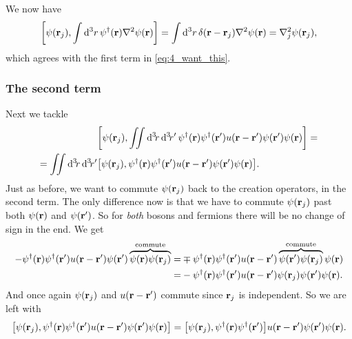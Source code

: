 \documentclass[11pt,letter, swedish, english
]{article}
\begin{document}
We now have
\begin{equation}\label{eq:4_comm_i}
\comm{\psi(\vb{r}_j)}{\int\rd^3r\,
\psi^\dagger(\vb{r})\laplacian\psi(\vb{r})}=
\int\rd^3r\,\delta(\vb{r}-\vb{r}_j)\laplacian\psi(\vb{r})
=\laplacian_j\psi(\vb{r}_j),
\end{equation}
which agrees with the first term in \eqref{eq:4_want_this}.

\subsubsection{The second term}
Next we tackle
\begin{equation}
\begin{aligned}
&\comm{\psi(\vb{r}_j)}{\iint\rd^3\!r\,\rd^3\!r'\,
\psi^\dagger(\vb{r})\psi^\dagger(\vb{r}')
u(\vb{r}-\vb{r}')\psi(\vb{r}')\psi(\vb{r})}=\\
=\iint\rd^3\!r\,\rd^3\!r'&
\comm{\psi(\vb{r}_j)}{
\psi^\dagger(\vb{r})\psi^\dagger(\vb{r}')
u(\vb{r}-\vb{r}')\psi(\vb{r}')\psi(\vb{r})}.
\end{aligned}
\end{equation}
Just as before, we want to commute $\psi(\vb{r}_j)$ back to the
creation operators, in the second term. The only difference now is
that we have to commute $\psi(\vb{r}_j)$ past both $\psi(\vb{r})$ and
$\psi(\vb{r}')$. So for \emph{both} bosons and fermions there will be no
change of sign in the end. We get
\begin{equation}
\begin{aligned}
-\psi^\dagger(\vb{r})\psi^\dagger(\vb{r}')
u(\vb{r}-\vb{r}')\psi(\vb{r}')
\overbrace{\psi(\vb{r})\psi(\vb{r}_j)}^{\text{commute}}
=&\mp\psi^\dagger(\vb{r})\psi^\dagger(\vb{r}')
u(\vb{r}-\vb{r}')
\overbrace{\psi(\vb{r}')\psi(\vb{r}_j)}^{\text{commute}}
\psi(\vb{r})\\
=&-\psi^\dagger(\vb{r})\psi^\dagger(\vb{r}')
u(\vb{r}-\vb{r}')\psi(\vb{r}_j)\psi(\vb{r}')\psi(\vb{r}).
\end{aligned}
\end{equation}
And once again $\psi(\vb{r}_j)$ and $u(\vb{r}-\vb{r}')$ commute since
$\vb{r}_j$ is independent. So we are left with
\begin{equation}
\comm{\psi(\vb{r}_j)}{
\psi^\dagger(\vb{r})\psi^\dagger(\vb{r}')
u(\vb{r}-\vb{r}')\psi(\vb{r}')\psi(\vb{r})}
=\comm{\psi(\vb{r}_j)}
{\psi^\dagger(\vb{r})\psi^\dagger(\vb{r}')}
u(\vb{r}-\vb{r}')\psi(\vb{r}')\psi(\vb{r}).
\end{equation}
\end{document}
